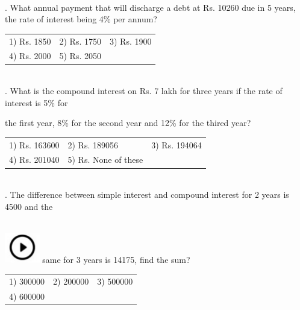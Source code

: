\documentclass{article}
\begin{document}
	\noindent 
	
	\noindent  \\ 
	
	. What annual payment that will discharge a debt at Rs. 10260 due in 5 years, the rate of interest being 4\% per annum?
	
	\noindent \begin{tabular}{p{1.7in} p{1.6in} p{1.6in}} \\ 
 1) Rs. 1850             & 2) Rs. 1750       & 3) Rs. 1900       \\
4) Rs. 2000      & 5) Rs. 2050 \\
\end{tabular}
	
	\noindent 
	
	\noindent  \\ 
	
	. What is the compound interest on Rs. 7 lakh for three years if the rate of interest is 5\% for
	
	\noindent 
	
	\noindent the first year, 8\% for the second year and 12\% for the thired year?
	
	\noindent 
	

		\begin{tabular}{p{1.7in} p{1.6in} p{1.6in}} \\ 
 1) Rs. 163600  & 2) Rs. 189056  & 3) Rs. 194064 
		\\
4) Rs. 201040  & 5) Rs. None of these  \\
\end{tabular}

	
	
	
	\noindent  \\ 
	
	. The difference between simple interest and compound interest for 2 years is 4500 and the
	
	\noindent  
	 
	\noindent \\ \includegraphics*[width=0.60in, height=0.52in]{images/image1} same for 3 years is 14175, find the sum?
	
	\noindent \begin{tabular}{p{1.7in} p{1.6in} p{1.6in}} \\ 
 1) 300000                & 2) 200000         & 3) 500000          \\
4) 600000 \\
\end{tabular}
	
\end{document}
